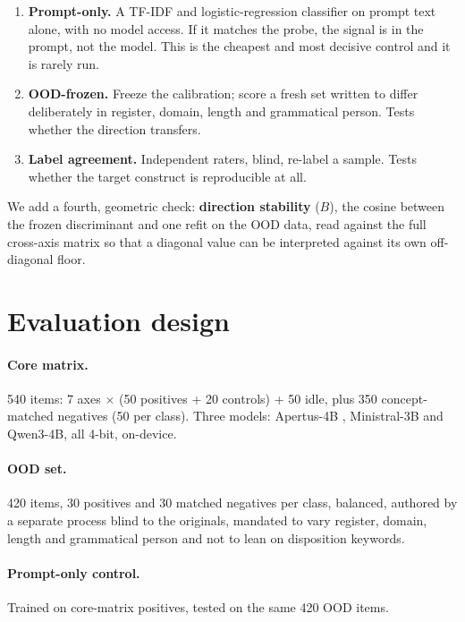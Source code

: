 \documentclass[11pt]{article}
\begin{document}
\begin{enumerate}
\item \textbf{Prompt-only.} A TF-IDF and logistic-regression classifier on prompt text alone, with
  no model access. If it matches the probe, the signal is in the prompt, not the model. This is
  the cheapest and most decisive control and it is rarely run.
\item \textbf{OOD-frozen.} Freeze the calibration; score a fresh set written to differ
  deliberately in register, domain, length and grammatical person. Tests whether the direction
  transfers.
\item \textbf{Label agreement.} Independent raters, blind, re-label a sample. Tests whether the
  target construct is reproducible at all.
\end{enumerate}

We add a fourth, geometric check: \textbf{direction stability} ($B$), the cosine between the frozen
discriminant and one refit on the OOD data, read against the full cross-axis matrix so that a
diagonal value can be interpreted against its own off-diagonal floor.

\section{Evaluation design}

\paragraph{Core matrix.} 540 items: 7 axes $\times$ (50 positives + 20 controls) + 50 idle, plus
350 concept-matched negatives (50 per class). Three models: Apertus-4B
\citep{apertus2025}, Ministral-3B and Qwen3-4B, all 4-bit, on-device.

\paragraph{OOD set.} 420 items, 30 positives and 30 matched negatives per class, balanced,
authored by a separate process blind to the originals, mandated to vary register, domain, length
and grammatical person and not to lean on disposition keywords.

\paragraph{Prompt-only control.} Trained on core-matrix positives, tested on the same 420 OOD
items.
\end{document}
